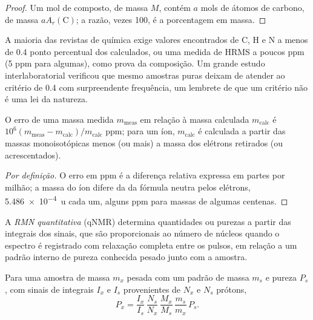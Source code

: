 \begin{proof}
Um mol de composto, de massa $M$, contém $a$ mols de átomos de carbono, de massa $aA_r(\mathrm C)$;
a razão, vezes 100, é a porcentagem em massa.
\end{proof}

A maioria das revistas de química exige valores encontrados de C, H e N a menos de 0.4 ponto
percentual dos calculados, ou uma medida de HRMS a poucos ppm (5 ppm
para algumas), como prova da composição. Um grande estudo interlaboratorial verificou que
mesmo amostras puras deixam de atender ao critério de 0.4 com surpreendente frequência, um lembrete de que um
critério não é uma lei da natureza.

\begin{proposition}\label{prop:b3:lab-techniques-3:ppm-error}
O erro de uma massa medida $m_{\mathrm{meas}}$ em relação à massa calculada $m_{\mathrm{calc}}$ é
$10^6(m_{\mathrm{meas}} - m_{\mathrm{calc}})/m_{\mathrm{calc}}$ ppm; para um íon, $m_{\mathrm{calc}}$ é calculada a partir das massas monoisotópicas menos (ou mais) a
massa dos elétrons retirados (ou acrescentados).
\end{proposition}

\begin{proof}[Por definição]
O erro em ppm é a diferença relativa expressa em partes por milhão; a
massa do íon difere da da fórmula neutra pelos elétrons, \qty{5.486e-4}{u} cada um, alguns
ppm para massas de algumas centenas.
\end{proof}

\begin{definition}\label{def:b3:lab-techniques-3:qnmr}
A \emph{RMN quantitativa} (qNMR) determina quantidades ou
purezas a partir das integrais dos sinais, que são proporcionais ao número de núcleos
quando o espectro é registrado com relaxação completa entre os pulsos, em relação a um
padrão interno de pureza conhecida pesado junto com a amostra.
\end{definition}

\begin{proposition}\label{prop:b3:lab-techniques-3:qnmr}
Para uma amostra de massa $m_x$ pesada com um padrão de massa $m_s$ e pureza $P_s$, com sinais
de integrais $I_x$ e $I_s$ provenientes de $N_x$ e $N_s$ prótons,
\[
  P_x = \frac{I_x}{I_s}\,\frac{N_s}{N_x}\,\frac{M_x}{M_s}\,\frac{m_s}{m_x}\,P_s.
\]
\end{proposition}

